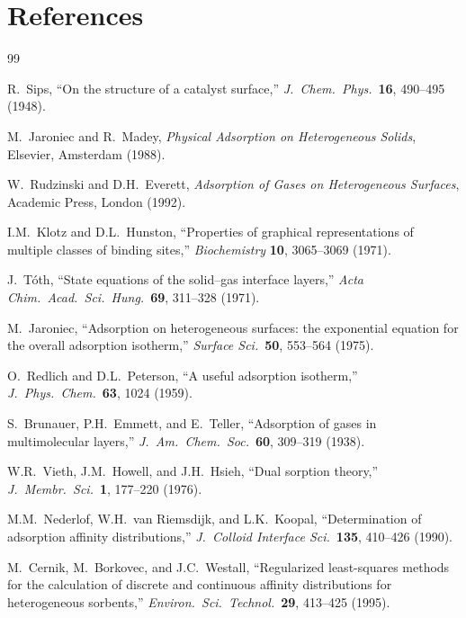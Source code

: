 \documentclass[12pt]{article}
\begin{document}
\section*{References}

\begin{thebibliography}{99}

R.~Sips, ``On the structure of a catalyst surface,''
\textit{J.\ Chem.\ Phys.}\ \textbf{16}, 490--495 (1948).

M.~Jaroniec and R.~Madey,
\textit{Physical Adsorption on Heterogeneous Solids},
Elsevier, Amsterdam (1988).

W.~Rudzinski and D.H.~Everett,
\textit{Adsorption of Gases on Heterogeneous Surfaces},
Academic Press, London (1992).

I.M.~Klotz and D.L.~Hunston,
``Properties of graphical representations of multiple classes of
binding sites,''
\textit{Biochemistry} \textbf{10}, 3065--3069 (1971).

J.~T\'oth,
``State equations of the solid--gas interface layers,''
\textit{Acta Chim.\ Acad.\ Sci.\ Hung.}\ \textbf{69}, 311--328 (1971).

M.~Jaroniec,
``Adsorption on heterogeneous surfaces: the exponential equation
for the overall adsorption isotherm,''
\textit{Surface Sci.}\ \textbf{50}, 553--564 (1975).

O.~Redlich and D.L.~Peterson,
``A useful adsorption isotherm,''
\textit{J.\ Phys.\ Chem.}\ \textbf{63}, 1024 (1959).

S.~Brunauer, P.H.~Emmett, and E.~Teller,
``Adsorption of gases in multimolecular layers,''
\textit{J.\ Am.\ Chem.\ Soc.}\ \textbf{60}, 309--319 (1938).

W.R.~Vieth, J.M.~Howell, and J.H.~Hsieh,
``Dual sorption theory,''
\textit{J.\ Membr.\ Sci.}\ \textbf{1}, 177--220 (1976).

M.M.~Nederlof, W.H.~van Riemsdijk, and L.K.~Koopal,
``Determination of adsorption affinity distributions,''
\textit{J.\ Colloid Interface Sci.}\ \textbf{135}, 410--426 (1990).

M.~Cernik, M.~Borkovec, and J.C.~Westall,
``Regularized least-squares methods for the calculation of discrete
and continuous affinity distributions for heterogeneous sorbents,''
\textit{Environ.\ Sci.\ Technol.}\ \textbf{29}, 413--425 (1995).

\end{thebibliography}
\end{document}
